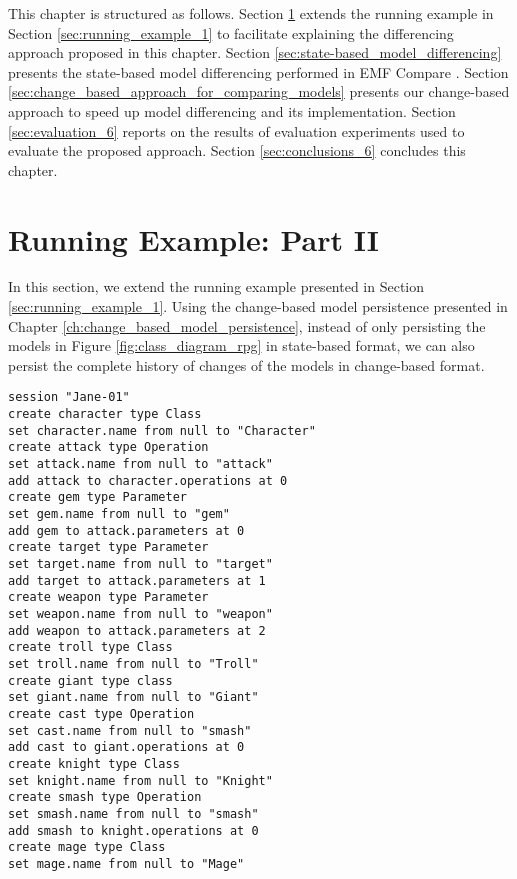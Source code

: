 This chapter is structured as follows. 
Section \ref{sec:runnnig_example_continue} extends the running example in Section \ref{sec:running_example_1} to facilitate explaining the differencing approach proposed in this chapter.
Section \ref{sec:state-based_model_differencing} presents the state-based model differencing performed in EMF Compare \cite{emfcompare2018developer}. 
Section \ref{sec:change_based_approach_for_comparing_models} presents our change-based approach to speed up model differencing and its implementation. 
Section \ref{sec:evaluation_6} reports on the results of evaluation experiments used to evaluate the proposed approach. Section \ref{sec:conclusions_6} concludes this chapter.

\section{Running Example: Part II}
\label{sec:runnnig_example_continue}
In this section, we extend the running example presented in Section \ref{sec:running_example_1}. Using the change-based model persistence presented in Chapter \ref{ch:change_based_model_persistence}, instead of only persisting the models in Figure \ref{fig:class_diagram_rpg} in state-based format, we can also persist the complete history of changes of the models in change-based format. 

\vspace{-20pt}
\begin{lstlisting}[style=eol,caption={Change-based representation of the original version in Figure \ref{fig:class_diagram_origin}.},label=lst:cbp_origin]
session "Jane-01"
create character type Class
set character.name from null to "Character" 
create attack type Operation
set attack.name from null to "attack" 
add attack to character.operations at 0
create gem type Parameter
set gem.name from null to "gem" 
add gem to attack.parameters at 0
create target type Parameter
set target.name from null to "target" 
add target to attack.parameters at 1
create weapon type Parameter
set weapon.name from null to "weapon" 
add weapon to attack.parameters at 2
create troll type Class
set troll.name from null to "Troll" 
create giant type class
set giant.name from null to "Giant"
create cast type Operation
set cast.name from null to "smash"
add cast to giant.operations at 0
create knight type Class
set knight.name from null to "Knight"
create smash type Operation
set smash.name from null to "smash"
add smash to knight.operations at 0
create mage type Class
set mage.name from null to "Mage" 
\end{lstlisting}

